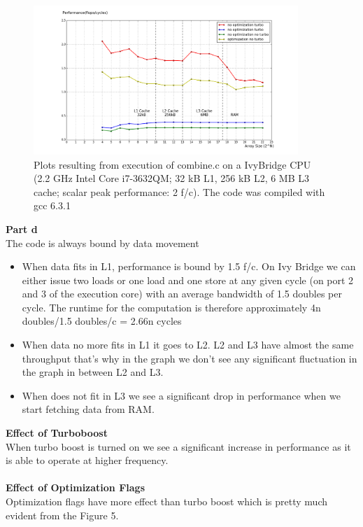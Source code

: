 \documentclass[letterpaper, 11pt]{article}
\begin{document}
\begin{figure}[h!]
    \centering
    \includegraphics[width=100mm]{sol_4_2}
    \caption{Plots resulting from execution of combine.c on a IvyBridge CPU (2.2 GHz Intel Core i7-3632QM; 32 kB L1, 256 kB L2, 6 MB L3 cache; scalar peak performance: 2 f/c). The code was compiled with gcc 6.3.1}
    \label{fig:performance_com}
\end{figure}
\textbf{Part d} \\
The code is always bound by data movement 
\begin{itemize}
\item When data fits in L1, performance is bound by 1.5 f/c. On Ivy Bridge we can either issue
two loads or one load and one store at any given cycle (on port 2 and 3 of the execution
core) with an average bandwidth of 1.5 doubles per cycle. The runtime for the computation
is therefore approximately 4n doubles/1.5 doubles/c = 2.66n cycles
\item When data no more fits in L1 it goes to L2. L2 and L3 have almost the same throughput that's why in the graph we don't see any significant fluctuation in the graph in between L2 and L3.
\item When does not fit in L3 we see a significant drop in performance when we start fetching data from RAM. 
\end{itemize}
\textbf{Effect of Turboboost} \\
When turbo boost is turned on we see a significant increase in performance as it is able to operate at higher frequency. \\ \\
\textbf{Effect of Optimization Flags} \\
Optimization flags have more effect than turbo boost which is pretty much evident from the Figure 5.
\bigskip
\end{document}

